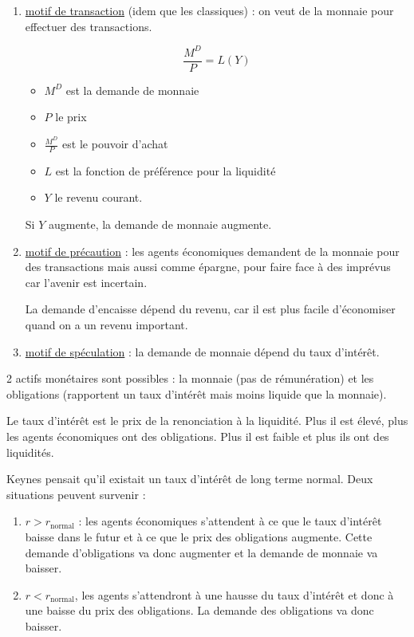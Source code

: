 	\begin{enumerate}
		\item \underline{motif de transaction} (idem que les classiques) : on veut de la monnaie pour effectuer des transactions.
		
		$$\frac{M^D}{P} = L(Y)$$
		
		\begin{itemize}
			\item $M^D$ est la demande de monnaie
			\item $P$ le prix
			\item $\frac{M^D}{P}$ est le pouvoir d'achat
			\item $L$ est la fonction de préférence pour la liquidité
			\item $Y$ le revenu courant.
		\end{itemize}
			
		Si $Y$ augmente, la demande de monnaie augmente.
		
		\item \underline{motif de précaution} : les agents économiques demandent de la monnaie pour des transactions mais aussi comme épargne, pour faire face à des imprévus car l'avenir est incertain.
		
		La demande d'encaisse dépend du revenu, car il est plus facile d'économiser quand on a un revenu important.
		
		\item \underline{motif de spéculation} : la demande de monnaie dépend du taux d'intérêt.
	\end{enumerate}
	
	2 actifs monétaires sont possibles : la monnaie (pas de rémunération) et les obligations (rapportent un taux d'intérêt mais moins liquide que la monnaie).
	
	Le taux d'intérêt est le prix de la renonciation à la liquidité. Plus il est élevé, plus les agents économiques ont des obligations. Plus il est faible et plus ils ont des liquidités.
	
	Keynes pensait qu'il existait un taux d'intérêt de long terme normal. Deux situations peuvent survenir :
	
	\begin{enumerate}
		\item $r > r_{\text{normal}}$ : les agents économiques s'attendent à ce que le taux d'intérêt baisse dans le futur et à ce que le prix des obligations augmente. Cette demande d'obligations va donc augmenter et la demande de monnaie va baisser.
		
		\item $r < r_{\text{normal}}$, les agents s'attendront à une hausse du taux d'intérêt et donc à une baisse du prix des obligations. La demande des obligations va donc baisser.
	\end{enumerate}
		
